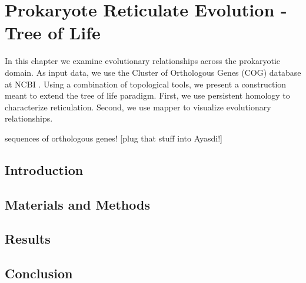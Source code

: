 \chapter{Prokaryote Reticulate Evolution - Tree of Life}
\label{ch:prokaryotes}

In this chapter we examine evolutionary relationships across the prokaryotic domain.
As input data, we use the Cluster of Orthologous Genes (COG) database at NCBI \cite{Galperin:2014ua}.
Using a combination of topological tools, we present a construction meant to extend the tree of life paradigm.
First, we use persistent homology to characterize reticulation.
Second, we use mapper to visualize evolutionary relationships.

sequences of orthologous genes! [plug that stuff into Ayasdi!]

\kje{[To Come.]}

\section{Introduction}
\section{Materials and Methods}
\section{Results}
\section{Conclusion}